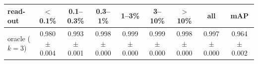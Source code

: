\begin{tabular}{lcccccccc}
\toprule
read-out & $<$0.1\% & 0.1--0.3\% & 0.3--1\% & 1--3\% & 3--10\% & $>$10\% & all & mAP \\
\midrule
oracle ($k=3$) & 0.980 $\pm$ 0.004 & 0.993 $\pm$ 0.001 & 0.998 $\pm$ 0.000 & 0.999 $\pm$ 0.000 & 0.999 $\pm$ 0.000 & 0.998 $\pm$ 0.000 & 0.997 $\pm$ 0.000 & 0.964 $\pm$ 0.002 \\
\bottomrule
\end{tabular}
